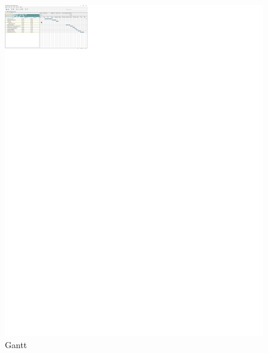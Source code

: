 \documentclass[12pt,a4paper,final,oneside]{report}
\begin{document}
\begin{figure}[h] 
\begin{center} 
\includegraphics[width=1300px]{gantt.png} \caption{Gantt} 
\end{center}
\end{figure}
\end{document}
